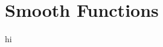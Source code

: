 \documentclass[twoside,10pt]{report}
\begin{document}


\chapter{Smooth Functions}

hi
\end{document}
